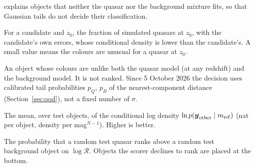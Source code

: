 \documentclass[11pt,a4paper]{article}
\newcommand{\vect}[1]{\boldsymbol{#1}}
\newcommand{\R}{\mathcal{R}}
\begin{document}
\begin{description}
  explains objects that neither the quasar nor the background mixture fits, so that Gaussian tails do
  not decide their classification.
\item[Support percentile.] For a candidate and $z_0$, the fraction of simulated quasars at $z_0$, with
  the candidate's own errors, whose conditional density is lower than the candidate's. A small value
  means the colours are unusual for a quasar at $z_0$.
\item[Outside both models.] An object whose colours are unlike both the quasar model (at any redshift) and
  the background model. It is not ranked. Since 5 October 2026 the decision uses calibrated tail
  probabilities $p_Q$, $p_B$ of the nearest-component distance (Section~\ref{sec:ood}), not a fixed number of
  $\sigma$.
\item[Held-out density.] The mean, over test objects, of the conditional log density
  $\ln p(\vect{y}_{\rm other}\mid m_{\rm ref})$ (nat per object, density per mag$^{N-1}$). Higher is better.
\item[AUC.] The probability that a random test quasar ranks above a random test background object on
  $\log\R$. Objects the scorer declines to rank are placed at the bottom.
\end{description}

\end{document}

